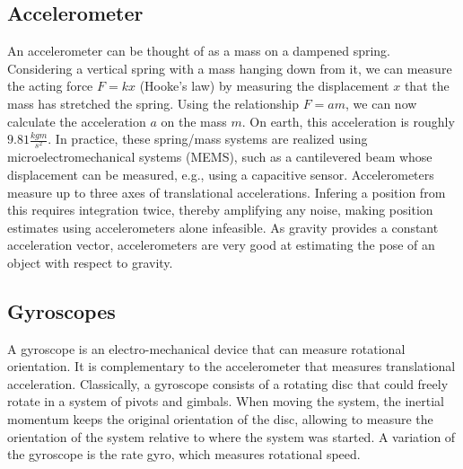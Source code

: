 \subsection{Accelerometer}
An accelerometer can be thought of as a mass on a dampened spring. Considering a vertical spring with a mass hanging down from it, we can measure the acting force $F=kx$ (Hooke's law) by measuring the displacement $x$ that the mass has stretched the spring. Using the relationship $F=am$, we can now calculate the acceleration $a$ on the mass $m$. On earth, this acceleration is roughly $9.81\frac{kg m}{s^2}$. In practice, these spring/mass systems are realized using microelectromechanical systems (MEMS), such as a cantilevered beam whose displacement can be measured, e.g., using a capacitive sensor. Accelerometers measure up to three axes of translational accelerations. Infering a position from this requires integration twice, thereby amplifying any noise, making position estimates using accelerometers alone infeasible. As gravity provides a constant acceleration vector, accelerometers are very good at estimating the pose of an object with respect to gravity.

\subsection{Gyroscopes}
A gyroscope is an electro-mechanical device that can measure rotational orientation. It is complementary to the accelerometer that measures translational acceleration. Classically, a gyroscope consists of a rotating disc that could freely rotate in a system of pivots and gimbals. When moving the system, the inertial momentum keeps the original orientation of the disc, allowing to measure the orientation of the system relative to where the system was started. A variation of the gyroscope is the rate gyro, which measures rotational speed.

